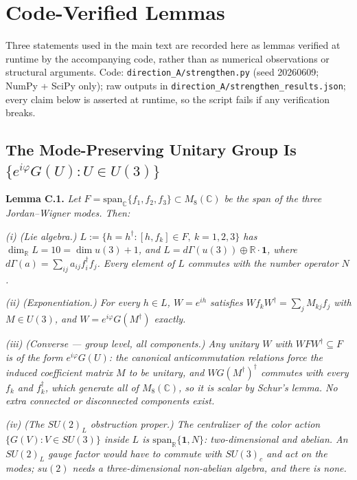 \documentclass[11pt]{article}
\newcommand{\CC}{\mathbb{C}}
\newcommand{\RR}{\mathbb{R}}
\begin{document}
\section{Code-Verified Lemmas}

Three statements used in the main text are recorded here as lemmas verified at runtime by the accompanying code, rather than as numerical observations or structural arguments. Code: \texttt{direction\_A/strengthen.py} (seed 20260609; NumPy + SciPy only); raw outputs in \texttt{direction\_A/strengthen\_results.json}; every claim below is asserted at runtime, so the script fails if any verification breaks.

\subsection{The Mode-Preserving Unitary Group Is \texorpdfstring{$\{e^{i\varphi} G(U) : U \in U(3)\}$}{\{exp(i phi) G(U) : U in U(3)\}}}

\textbf{Lemma C.1.} \emph{Let $F = \mathrm{span}_\CC\{f_1, f_2, f_3\} \subset M_8(\CC)$ be the span of the three Jordan--Wigner modes. Then:}

\emph{(i) (Lie algebra.) $L := \{h = h^\dagger : [h, f_k] \in F,\ k = 1, 2, 3\}$ has $\dim_\RR L = 10 = \dim u(3) + 1$, and $L = d\Gamma(u(3)) \oplus \RR\cdot\mathbf{1}$, where $d\Gamma(a) = \sum_{ij} a_{ij} f_i^\dagger f_j$. Every element of $L$ commutes with the number operator $N$.}

\emph{(ii) (Exponentiation.) For every $h \in L$, $W = e^{ih}$ satisfies $W f_k W^\dagger = \sum_j M_{kj} f_j$ with $M \in U(3)$, and $W = e^{i\varphi} G(M^\dagger)$ exactly.}

\emph{(iii) (Converse --- group level, all components.) Any unitary $W$ with $W F W^\dagger \subseteq F$ is of the form $e^{i\varphi} G(U)$: the canonical anticommutation relations force the induced coefficient matrix $M$ to be unitary, and $W G(M^\dagger)^\dagger$ commutes with every $f_k$ and $f_k^\dagger$, which generate all of $M_8(\CC)$, so it is scalar by Schur's lemma. No extra connected or disconnected components exist.}

\emph{(iv) (The $SU(2)_L$ obstruction proper.) The centralizer of the color action $\{G(V) : V \in SU(3)\}$ inside $L$ is $\mathrm{span}_\RR\{\mathbf{1}, N\}$: two-dimensional and abelian. An $SU(2)_L$ gauge factor would have to commute with $SU(3)_c$ and act on the modes; $su(2)$ needs a three-dimensional non-abelian algebra, and there is none.}
\end{document}
